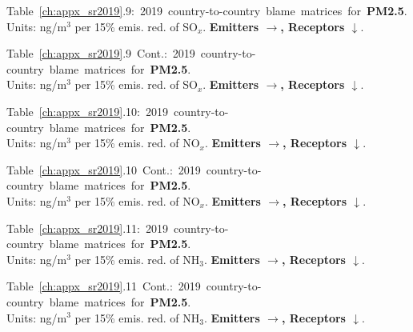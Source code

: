 \footnotesize{\mbox{Table \ref{ch:appx_sr2019}.9: 2019 country-to-country blame matrices for \textbf{PM2.5}.}\\ Units: ng/m$^3$ per 15\% emis. red. of SO$_x$. \textbf{Emitters $\rightarrow$, Receptors $\downarrow$}. }\\[\baselineskip]\enlargethispage{\myenlarge} \hspace{-0.5cm} 
\centerline{}\clearpage
\footnotesize{\mbox{Table \ref{ch:appx_sr2019}.9 Cont.: 2019 country-to-country blame matrices for \textbf{PM2.5}.}\\ Units: ng/m$^3$ per 15\% emis. red. of SO$_x$. \textbf{Emitters $\rightarrow$, Receptors $\downarrow$}. }\\[\baselineskip]\enlargethispage{\myenlarge} \hspace{-0.5cm} 
\centerline{}\clearpage

\footnotesize{\mbox{Table \ref{ch:appx_sr2019}.10: 2019 country-to-country blame matrices for \textbf{PM2.5}.}\\ Units: ng/m$^3$ per 15\% emis. red. of NO$_x$. \textbf{Emitters $\rightarrow$, Receptors $\downarrow$}. }\\[\baselineskip]\enlargethispage{\myenlarge} \hspace{-0.5cm} 
\centerline{}\clearpage
\footnotesize{\mbox{Table \ref{ch:appx_sr2019}.10 Cont.: 2019 country-to-country blame matrices for \textbf{PM2.5}.}\\ Units: ng/m$^3$ per 15\% emis. red. of NO$_x$. \textbf{Emitters $\rightarrow$, Receptors $\downarrow$}. }\\[\baselineskip]\enlargethispage{\myenlarge} \hspace{-0.5cm} 
\centerline{}\clearpage

\footnotesize{\mbox{Table \ref{ch:appx_sr2019}.11: 2019 country-to-country blame matrices for \textbf{PM2.5}.}\\ Units: ng/m$^3$ per 15\% emis. red. of NH$_3$. \textbf{Emitters $\rightarrow$, Receptors $\downarrow$}. }\\[\baselineskip]\enlargethispage{\myenlarge} \hspace{-0.5cm} 
\centerline{}\clearpage
\footnotesize{\mbox{Table \ref{ch:appx_sr2019}.11 Cont.: 2019 country-to-country blame matrices for \textbf{PM2.5}.}\\ Units: ng/m$^3$ per 15\% emis. red. of NH$_3$. \textbf{Emitters $\rightarrow$, Receptors $\downarrow$}. }\\[\baselineskip]\enlargethispage{\myenlarge} \hspace{-0.5cm} 
\centerline{}\clearpage

